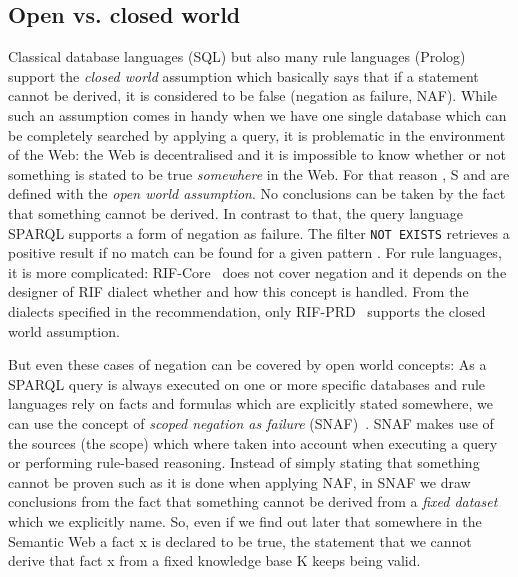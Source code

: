 \subsection{Open vs. closed world}\label{closedworld}
 Classical database languages (\eg SQL)  but also many rule languages (\eg Prolog) support the \emph{closed world} assumption which basically says that if a statement cannot 
be derived, 
it is considered to be false (negation as failure, NAF). While such an assumption comes in handy when we have one single database which can be completely searched by applying a query, 
it is problematic 
in the environment of the Web: the Web is decentralised and it is impossible to know whether or not something is stated to be true \emph{somewhere} in the Web.
For that reason \rdf, \rdf{}S and \owl are defined with the \emph{open world assumption}. No conclusions can be taken by the fact that something cannot be derived. 
In contrast to that, the query language SPARQL supports a form of negation as failure. The
filter \texttt{NOT EXISTS} retrieves a positive result if no match can be found for a given pattern \cite[Section 8]{sparql}.
For rule languages, it is more complicated:
RIF-Core~\cite{rifcore} does not cover negation and it depends on the designer of RIF dialect whether and how this concept is handled. From the dialects 
specified in the \wwwc recommendation, only RIF-PRD~\cite{rifprd} supports the closed world assumption. 

But even these cases of negation can be covered by open world concepts: As a SPARQL query is always executed on one or more specific databases and 
rule languages rely on facts and formulas which are explicitly stated somewhere, we  
can use the concept of \emph{scoped negation as failure} (SNAF)~\cite{kifer2005,polleres2006rules,damasio2006supporting}. SNAF makes use of the sources (the scope) 
which where taken into account when executing a 
query or performing rule-based reasoning. Instead of simply stating that something cannot be proven such as it is done when applying NAF, in SNAF  we
draw conclusions from the fact that something cannot be derived from a \emph{fixed dataset} which we explicitly name. 
So, even if we find out later that somewhere in the Semantic Web a fact x is declared to be true, 
the statement that we cannot derive that fact x from a fixed knowledge base K 
keeps being valid.  



